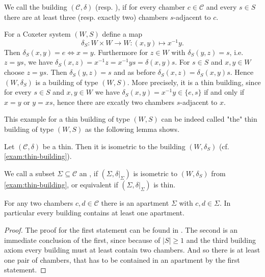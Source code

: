 \begin{defi}
	We call the building $(\mathcal{C}, \delta)$  (resp. ), if for every chamber $c \in \mathcal{C}$ and every $s \in S$ there are at least three (resp. exactly two) chambers $s$-adjacent to $c$.
\end{defi}

\begin{exam}
	For a Coxeter system $(W,S)$ define a map
	$$ \delta_S : W \times W \to W : (x,y) \mapsto x^{-1}y. $$
	Then $\delta_S(x,y) = e \iff x = y$. Furthermore for $z \in W$ with $\delta_S(y,z) = s$, i.e. $z = ys$, we have $\delta_S(x,z) = x^{-1}z = x^{-1}ys = \delta(x,y)s$. For $s \in S$ and $x,y \in W$ choose $z = ys$. Then $\delta_S(y,z) = s$ and as before $\delta_S(x,z) = \delta_S(x,y)s$. Hence $(W,\delta_S)$ is a building of type $(W,S)$. More precisely, it is a thin building, since for every $s \in S$ and $x,y \in W$ we have $\delta_S(x,y) = x^{-1}y \in \{e,s\}$ if and only if $x = y$ or $y = xs$, hence there are excatly two chambers $s$-adjacent to $x$.
\end{exam}

This example for a thin building of type $(W,S)$ can be indeed called "the" thin building of type $(W,S)$ as the following lemma shows.

\begin{lemm}
	Let $(\mathcal{C}, \delta)$ be a thin. Then it is isometric to the building $(W, \delta_S)$ (cf. \ref{exam:thin-building}).
\end{lemm}

\begin{defi}
	We call a subset $\Sigma \subseteq \mathcal{C}$ an , if $(\Sigma, \delta|_\Sigma)$ is isometric to $(W,\delta_S)$ from \ref{exam:thin-building}, or equivalent if $(\Sigma, \delta|_\Sigma)$ is thin.
\end{defi}

\begin{theo}
	For any two chambers $c,d \in \mathcal{C}$ there is an apartment $\Sigma$ with $c,d \in \Sigma$. In particular every building contains at least one apartment.

	\begin{proof}
		The proof for the first statement can be found in \cite[Theorem 11.2.5]{buekenhout:diagram-geometry}. The second is an immediate conclusion of the first, since because of $|S| \geq 1$ and the third building axiom every building must at least contain two chambers. And so there is at least one pair of chambers, that has to be contained in an apartment by the first statement.
	\end{proof}
\end{theo}

